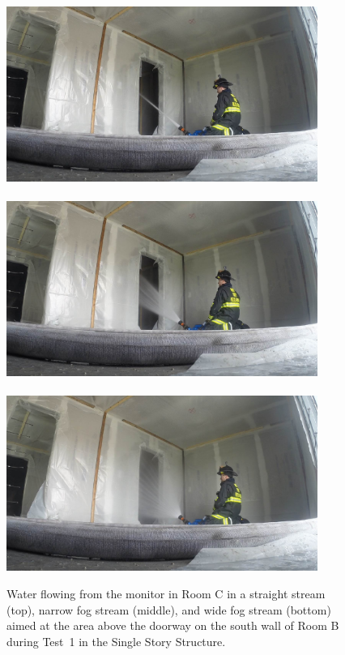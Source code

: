 \documentclass[12pt,oneside]{book}
\begin{document}
\begin{figure}[!ht]
	\includegraphics[trim=16cm 6.25cm 9cm 6cm, clip=true, width=4in]{../Figures/Pictures/SS_Room_B_Test_33}
	\\~\\
	\includegraphics[trim=16cm 6.25cm 9cm 6cm, clip=true, width=4in]{../Figures/Pictures/NF_Room_B_Test_33}
	\\~\\
	\includegraphics[trim=16cm 6.25cm 9cm 6cm, clip=true, width=4in]{../Figures/Pictures/WF_Room_B_Test_33}
	\caption[Straight stream, narrow fog stream, and wide fog stream during Test~1.]{Water flowing from the monitor in Room C in a straight stream (top), narrow fog stream (middle), and wide fog stream (bottom) aimed at the area above the doorway on the south wall of Room B during Test~1 in the Single Story Structure.}
	\label{fig:test_1_pic}
\end{figure}
\end{document}
